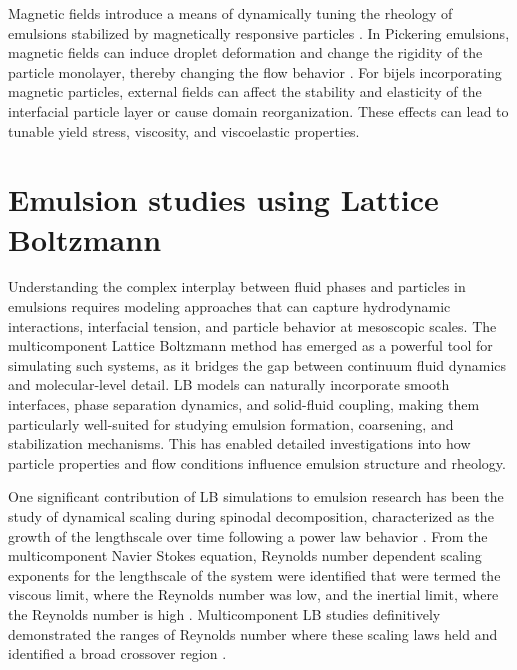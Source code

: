Magnetic fields introduce a means of dynamically tuning the rheology of emulsions stabilized by magnetically responsive particles \cite{qiao_magnetorheological_2012}. 
In Pickering emulsions, magnetic fields can induce droplet deformation and change the rigidity of the particle monolayer, thereby changing the flow behavior \cite{qiao_magnetorheological_2012}. 
For bijels incorporating magnetic particles, external fields can affect the stability and elasticity of the interfacial particle layer or cause domain reorganization. These effects can lead to 
tunable yield stress, viscosity, and viscoelastic properties.

\section{Emulsion studies using Lattice Boltzmann}

Understanding the complex interplay between fluid phases and particles in emulsions requires modeling approaches that can capture hydrodynamic interactions, interfacial tension, and particle 
behavior at mesoscopic scales. The multicomponent Lattice Boltzmann method has emerged as a powerful tool for simulating such systems, as it bridges the gap between continuum fluid dynamics 
and molecular-level detail. LB models can naturally incorporate smooth interfaces, phase separation dynamics, and solid-fluid coupling, making them particularly well-suited for studying 
emulsion formation, coarsening, and stabilization mechanisms. This has enabled detailed investigations into how particle properties and flow conditions influence emulsion structure and rheology.

One significant contribution of LB simulations to emulsion research has been the study of dynamical scaling during spinodal decomposition, characterized as the growth of the lengthscale
over time following a power law behavior \cite{siggia_late_1979, furukawa_role_1994}. From the multicomponent Navier Stokes equation, Reynolds number dependent scaling exponents for the 
lengthscale of the system were identified that were termed the viscous limit, where the Reynolds number was low, and the inertial limit, where the Reynolds number is high \cite{kendon_inertial_2001}.
Multicomponent LB studies definitively demonstrated the ranges of Reynolds number where these scaling laws held and identified a broad crossover region \cite{kendon_inertial_2001, kendon_3d_1999}.

